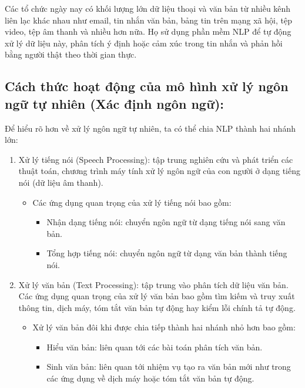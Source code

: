 Các tổ chức ngày nay có khối lượng lớn dữ liệu thoại và văn bản từ nhiều kênh liên lạc khác nhau như email, tin nhắn văn bản, bảng tin trên mạng xã hội, tệp video, tệp âm thanh và nhiều hơn nữa. Họ sử dụng phần mềm NLP để tự động xử lý dữ liệu này, phân tích ý định hoặc cảm xúc trong tin nhắn và phản hồi bằng người thật theo thời gian thực.

\clearpage
\subsection{Cách thức hoạt động của mô hình xử lý ngôn ngữ tự nhiên (Xác định ngôn ngữ):}

Để hiểu rõ hơn về xử lý ngôn ngữ tự nhiên, ta có thể chia NLP thành hai nhánh lớn:
\begin{enumerate}

\item Xử lý tiếng nói (Speech Processing): tập trung nghiên cứu và phát triển các thuật toán, chương trình máy tính xử lý ngôn ngữ của con người ở dạng tiếng nói (dữ liệu âm thanh).
\begin{itemize}
\item Các ứng dụng quan trọng của xử lý tiếng nói bao gồm:
\begin{itemize}
    \item Nhận dạng tiếng nói: chuyển ngôn ngữ từ dạng tiếng nói sang văn bản.
    \item Tổng hợp tiếng nói: chuyển ngôn ngữ từ dạng văn bản thành tiếng nói.
\end{itemize}
\end{itemize}

\item Xử lý văn bản (Text Processing): tập trung vào phân tích dữ liệu văn bản. Các ứng dụng quan trọng của xử lý văn bản bao gồm tìm kiếm và truy xuất thông tin, dịch máy, tóm tắt văn bản tự động hay kiểm lỗi chính tả tự động.
\begin{itemize}
\item Xử lý văn bản đôi khi được chia tiếp thành hai nhánh nhỏ hơn bao gồm:
\begin{itemize}
    \item Hiểu văn bản: liên quan tới các bài toán phân tích văn bản.
    \item Sinh văn bản: liên quan tới nhiệm vụ tạo ra văn bản mới như trong các ứng dụng về dịch máy hoặc tóm tắt văn bản tự động. 
\end{itemize}
\end{itemize}


\end{enumerate}
